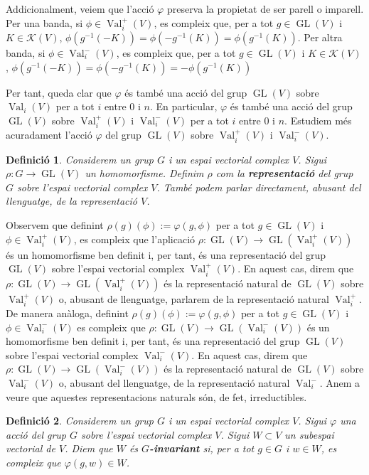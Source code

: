 \documentclass{article}
\newtheorem{definicio}{Definici\'{o}}
\theoremstyle{definition}
\DeclareMathOperator{\Val}{Val}
\DeclareMathOperator{\GL}{GL}
\begin{document}
Addicionalment, veiem que l'acci\'{o} $\varphi$ preserva la propietat de ser parell o imparell. Per una banda, si $\phi \in \Val_i^+(V)$, es compleix que, per a tot $g \in \GL(V)$ i $K \in \mathcal{K}(V)$,
$\phi(g^{-1} (-K)) = \phi(-g^{-1} (K)) = \phi(g^{-1} (K))$. Per altra banda, si $\phi \in \Val_i^-(V)$, es compleix que, per a tot $g \in \GL(V)$ i $K \in \mathcal{K}(V)$,
$\phi(g^{-1} (-K)) = \phi(-g^{-1} (K)) = -\phi(g^{-1} (K))$

Per tant, queda clar que $\varphi$ \'{e}s tamb\'{e} una acci\'{o} del grup $\GL(V)$ sobre $\Val_i(V)$ per a tot $i$ entre $0$ i $n$. En particular, $\varphi$ \'{e}s tamb\'{e} una acci\'{o} del grup $\GL(V)$ sobre $\Val_i^+(V)$ i $\Val_i^-(V)$ per a tot $i$ entre $0$ i $n$. Estudiem m\'{e}s acuradament l'acci\'{o} $\varphi$ del grup $\GL(V)$ sobre $\Val_i^+(V)$ i $\Val_i^-(V)$. 

\begin{definicio}\label{Def:representacio}
Considerem un grup $G$ i un espai vectorial complex $V$. Sigui $\rho: G \longrightarrow \GL(V)$ un homomorfisme. Definim $\rho$ com la \textbf{representaci\'{o}} del grup $G$ sobre l'espai vectorial complex $V$. Tamb\'{e} podem parlar directament, abusant del llenguatge, de la representaci\'{o} $V$.
\end{definicio}

Observem que definint $\rho (g) (\phi) := \varphi(g, \phi)$ per a tot $g \in \GL(V)$ i $\phi \in \Val_i^+(V)$, es compleix que l'aplicaci\'{o} $\rho: \GL(V) \longrightarrow \GL(\Val_i^+(V))$ \'{e}s un homomorfisme ben definit i, per tant, \'{e}s una representaci\'{o} del grup $\GL(V)$ sobre l'espai vectorial complex $\Val_i^+(V)$. En aquest cas, direm que $\rho: \GL(V) \longrightarrow \GL(\Val_i^+(V))$ \'{e}s la representaci\'{o} natural de $\GL(V)$ sobre $\Val_i^+(V)$ o, abusant de llenguatge, parlarem de la representaci\'{o} natural $\Val_i^+$. De manera an\`{a}loga, definint $\rho (g) (\phi) := \varphi(g, \phi)$ per a tot $g \in \GL(V)$ i $\phi \in \Val_i^-(V)$ es compleix que $\rho: \GL(V) \longrightarrow \GL(\Val_i^-(V))$ \'{e}s un homomorfisme ben definit i, per tant, \'{e}s una representaci\'{o} del grup $\GL(V)$ sobre l'espai vectorial complex $\Val_i^-(V)$. En aquest cas, direm que $\rho: \GL(V) \longrightarrow \GL(\Val_i^-(V))$ \'{e}s la representaci\'{o} natural de $\GL(V)$ sobre $\Val_i^-(V)$ o, abusant del llenguatge, de la representaci\'{o} natural $\Val_i^-$. Anem a veure que aquestes representacions naturals s\'{o}n, de fet, irreductibles.

\begin{definicio}\label{Def:invariant}
Considerem un grup $G$ i un espai vectorial complex $V$. Sigui $\varphi$ una acci\'{o} del grup $G$ sobre l'espai vectorial complex $V$. Sigui $W \subset V$ un subespai vectorial de $V$. Diem que $W$ \'{e}s \textbf{$G$-invariant} si, per a tot $g \in G$ i $w \in W$, es compleix que $\varphi(g, w) \in W$.
\end{definicio}
\end{document}
